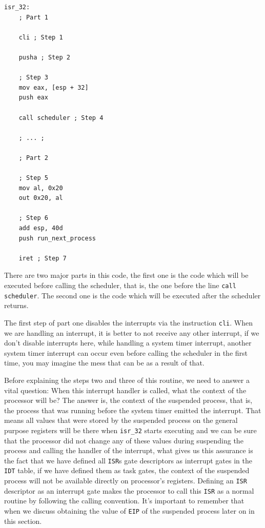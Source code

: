 \begin{lstlisting}
isr_32:
    ; Part 1
    
    cli ; Step 1
    
    pusha ; Step 2
    
    ; Step 3
    mov eax, [esp + 32]
    push eax  
    
    call scheduler ; Step 4
    
    ; ... ;
    
    ; Part 2
    
    ; Step 5
    mov al, 0x20
    out 0x20, al
    
    ; Step 6
    add esp, 40d
    push run_next_process
    
    iret ; Step 7
\end{lstlisting}

There are two major parts in this code, the first one is the code which
will be executed before calling the scheduler, that is, the one before
the line \lstinline!call scheduler!. The second one is the code which
will be executed after the scheduler returns.

The first step of part one disables the interrupts via the instruction
\lstinline!cli!. When we are handling an interrupt, it is better to not
receive any other interrupt, if we don't disable interrupts here, while
handling a system timer interrupt, another system timer interrupt can
occur even before calling the scheduler in the first time, you may
imagine the mess that can be as a result of that.

Before explaining the steps two and three of this routine, we need to
answer a vital question: When this interrupt handler is called, what the
context of the processor will be? The answer is, the context of the
suspended process, that is, the process that was running before the
system timer emitted the interrupt. That means all values that were
stored by the suspended process on the general purpose registers will be
there when \lstinline!isr_32! starts executing and we can be sure that
the processor did not change any of these values during suspending the
process and calling the handler of the interrupt, what gives us this
assurance is the fact that we have defined all \lstinline!ISR!s gate
descriptors as interrupt gates in the \lstinline!IDT! table, if we have
defined them as task gates, the context of the suspended process will
not be available directly on processor's registers. Defining an
\lstinline!ISR! descriptor as an interrupt gate makes the processor to
call this \lstinline!ISR! as a normal routine by following the calling
convention. It's important to remember that when we discuss obtaining
the value of \lstinline!EIP! of the suspended process later on in this
section.

